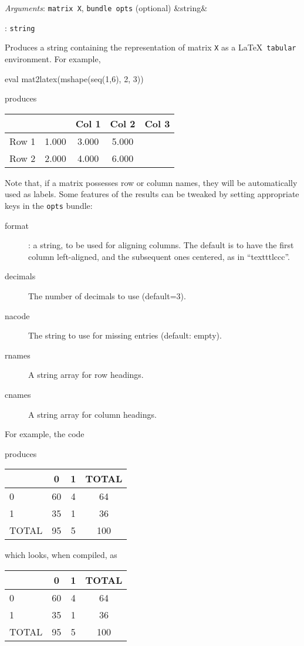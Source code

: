 \documentclass[11pt,english]{article}
\newcommand{\ArgRet}[2]{%
  {\it Arguments}: {#1}%
  \ifx&#2&%
  \else
  \par\smallskip\noindent {\it Return type}: \texttt{#2}
  \fi%
  \par\medskip\par%
  }
\begin{document}
\ArgRet{\texttt{matrix X}, \texttt{bundle opts} (optional)}{string}

Produces a string containing the representation of matrix \texttt{X}
as a \LaTeX\ \texttt{tabular} environment. For example,
\begin{code}
eval mat2latex(mshape(seq(1,6), 2, 3))
\end{code}
produces
\begin{code}
\begin{tabular}{lccc}
\hline
 &	  &	 Col 1  &	 Col 2  &	 Col 3 \\ \hline
Row 1 & 1.000	 & 3.000	 & 5.000 \\
Row 2 & 2.000	 & 4.000	 & 6.000 \\
\hline
\end{tabular}
\end{code}
Note that, if a matrix possesses row or column names, they will be
automatically used as labels. Some features of the results can be
tweaked by setting appropriate keys in the \texttt{opts} bundle:
\begin{description}
\item[format]: a string, to be used for aligning columns. The default
  is to have the first column left-aligned, and the subsequent ones
  centered, as in ``texttt{lccc}''.
\item[decimals] The number of decimals to use (default=3).
\item[nacode] The string to use for missing entries (default: empty).
\item[rnames] A string array for row headings.
\item[cnames] A string array for column headings.
\end{description}

For example, the code
produces
\begin{code}
\begin{tabular}{lccc}
\hline
 &	   0  &	    1  &	 TOTAL \\ \hline
   0 & 60	 & 4	 & 64 \\
   1 & 35	 & 1	 & 36 \\
TOTAL & 95	 & 5	 & 100 \\
\hline
\end{tabular}
\end{code}
which looks, when compiled, as
\begin{center}
\begin{tabular}{lccc}
\hline
 &	   0  &	    1  &	 TOTAL \\ \hline
   0 & 60	 & 4	 & 64 \\
   1 & 35	 & 1	 & 36 \\
TOTAL & 95	 & 5	 & 100 \\
\hline
\end{tabular}
\end{center}
\end{document}
